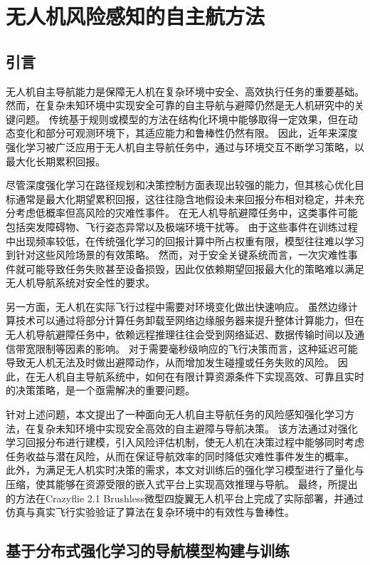 \chapter{无人机风险感知的自主航方法}


\section{引言}
无人机自主导航能力是保障无人机在复杂环境中安全、高效执行任务的重要基础。
然而，在复杂未知环境中实现安全可靠的自主导航与避障仍然是无人机研究中的关键问题。
传统基于规则或模型的方法在结构化环境中能够取得一定效果，但在动态变化和部分可观测环境下，其适应能力和鲁棒性仍然有限。
因此，近年来深度强化学习被广泛应用于无人机自主导航任务中，通过与环境交互不断学习策略，以最大化长期累积回报。

尽管深度强化学习在路径规划和决策控制方面表现出较强的能力，但其核心优化目标通常是最大化期望累积回报，这往往隐含地假设未来回报分布相对稳定，并未充分考虑低概率但高风险的灾难性事件。
在无人机导航避障任务中，这类事件可能包括突发障碍物、飞行姿态异常以及极端环境干扰等。
由于这些事件在训练过程中出现频率较低，在传统强化学习的回报计算中所占权重有限，模型往往难以学习到针对这些风险场景的有效策略。
然而，对于安全关键系统而言，一次灾难性事件就可能导致任务失败甚至设备损毁，因此仅依赖期望回报最大化的策略难以满足无人机导航系统对安全性的要求。

另一方面，无人机在实际飞行过程中需要对环境变化做出快速响应。
虽然边缘计算技术可以通过将部分计算任务卸载至网络边缘服务器来提升整体计算能力，但在无人机导航避障任务中，依赖远程推理往往会受到网络延迟、数据传输时间以及通信带宽限制等因素的影响。
对于需要毫秒级响应的飞行决策而言，这种延迟可能导致无人机无法及时做出避障动作，从而增加发生碰撞或任务失败的风险。
因此，在无人机自主导航系统中，如何在有限计算资源条件下实现高效、可靠且实时的决策策略，是一个亟需解决的重要问题。

针对上述问题，本文提出了一种面向无人机自主导航任务的风险感知强化学习方法，在复杂未知环境中实现安全高效的自主避障与导航决策。
该方法通过对强化学习回报分布进行建模，引入风险评估机制，使无人机在决策过程中能够同时考虑任务收益与潜在风险，从而在保证导航效率的同时降低灾难性事件发生的概率。
此外，为满足无人机实时决策的需求，本文对训练后的强化学习模型进行了量化与压缩，使其能够在资源受限的嵌入式平台上实现高效推理与导航。
最终，所提出的方法在Crazyflie 2.1 Brushless微型四旋翼无人机平台上完成了实际部署，并通过仿真与真实飞行实验验证了算法在复杂环境中的有效性与鲁棒性。
\section{基于分布式强化学习的导航模型构建与训练}

